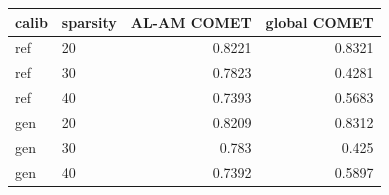\begin{tabular}{llrr}
\toprule
calib & sparsity & AL-AM COMET & global COMET \\
\midrule
ref & 20 & 0.8221 & 0.8321 \\
ref & 30 & 0.7823 & 0.4281 \\
ref & 40 & 0.7393 & 0.5683 \\
gen & 20 & 0.8209 & 0.8312 \\
gen & 30 & 0.783 & 0.425 \\
gen & 40 & 0.7392 & 0.5897 \\
\bottomrule
\end{tabular}
